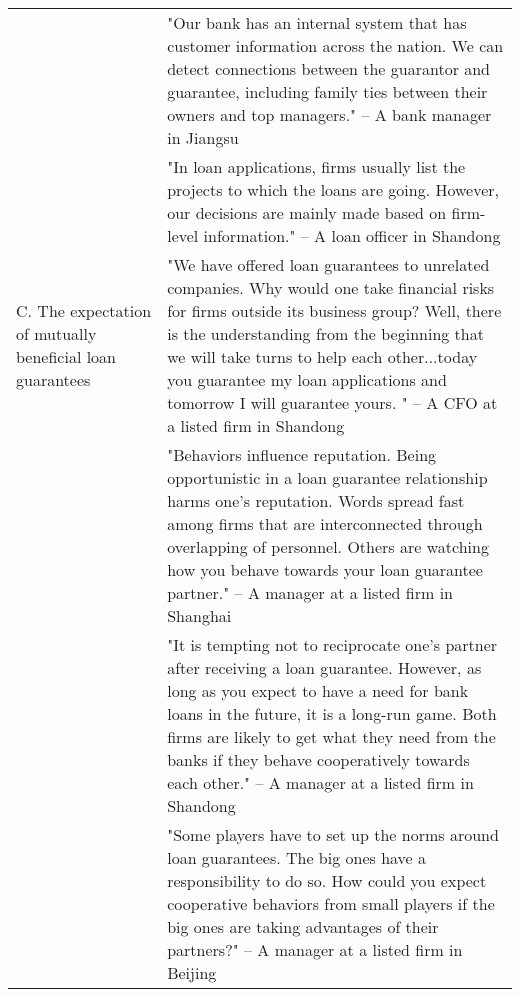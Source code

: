 \begin{singlespace}
\begin{center}
\begin{longtable}[c]{p{0.3\linewidth} | p{0.7\linewidth}}
                                                                             & "Our bank has an internal system that has customer information across the nation. We can detect   connections between the guarantor and guarantee, including family ties   between their owners and top managers." -- A bank manager in Jiangsu                                                                                                                  \\ \cline{2-2} 
                                                                             & "In loan applications,   firms usually list the projects to which the loans are going. However, our   decisions are mainly made based on firm-level information." -- A loan   officer in Shandong                                                                                                                                                                  \\ \hline
C. The expectation of mutually beneficial loan guarantees & "We have offered loan   guarantees to unrelated companies. Why would one take financial risks for   firms outside its business group? Well, there is the understanding from the   beginning that we will take turns to help each other...today you guarantee my   loan applications and tomorrow I will guarantee yours. " -- A CFO at a   listed firm in Shandong \\ \cline{2-2} 
                                                                             & "Behaviors influence   reputation. Being opportunistic in a loan guarantee relationship harms one's   reputation. Words spread fast among firms that are interconnected through   overlapping of personnel. Others are watching how you behave towards your loan   guarantee partner." -- A manager at a listed firm in Shanghai                                   \\ \cline{2-2} 
                                                                             & "It is tempting not to   reciprocate one's partner after receiving a loan guarantee. However, as long   as you expect to have a need for bank loans in the future, it is a long-run   game. Both firms are likely to get what they need from the banks if they behave   cooperatively towards each other." -- A manager at a listed firm in   Shandong             \\ \cline{2-2} 
                                                                             & "Some players have to set   up the norms around loan guarantees. The big ones have a responsibility to do   so. How could you expect cooperative behaviors from small players if the big   ones are taking advantages of their partners?"  -- A manager at a listed firm in Beijing                                                                                \\ \hline
\end{longtable}
\end{center}
\end{singlespace}